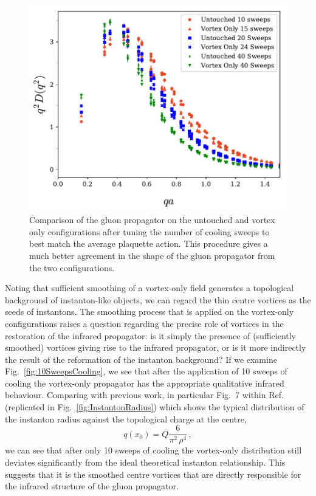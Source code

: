 %
\begin{figure}[htb!]
\centering
\includegraphics[width=\linewidth]{./ScalarGluComp_q2_UVOActionMatch.pdf}
\caption[Comparison of the gluon propagator on the untouched and vortex only configurations after action matching.]{\label{fig:UVOActionMatch}Comparison of the gluon propagator on the untouched and vortex only configurations after tuning the number of cooling sweeps to best match the average plaquette action. This procedure gives a much better agreement in the shape of the gluon propagator from the two configurations.}
\end{figure}
%

Noting that sufficient smoothing of a vortex-only field generates a topological background of instanton-like objects, we can regard the thin centre vortices as the seeds of instantons. The smoothing process that is applied on the vortex-only configurations raises a question regarding the precise role of vortices in the restoration of the infrared propagator: is it simply the presence of (sufficiently smoothed) vortices giving rise to the infrared propagator, or is it more indirectly the result of the reformation of the instanton background? If we examine Fig.~\ref{fig:10SweepsCooling}, we see that after the application of 10 sweeps of cooling the vortex-only propagator has the appropriate qualitative infrared behaviour. Comparing with previous work, in particular Fig.~7 within Ref.~\cite{Trewartha:2015ida} (replicated in Fig.~\ref{fig:InstantonRadius}) which shows the typical distribution of the instanton radius against the topological charge at the centre,
\begin{equation}
q(x_0) = Q\frac{6}{\pi^2\,\rho^4}\, ,
\end{equation}
we can see that after only 10 sweeps of cooling the vortex-only distribution still deviates significantly from the ideal theoretical instanton relationship. This suggests that it is the smoothed centre vortices that are directly responsible for the infrared structure of the gluon propagator.

